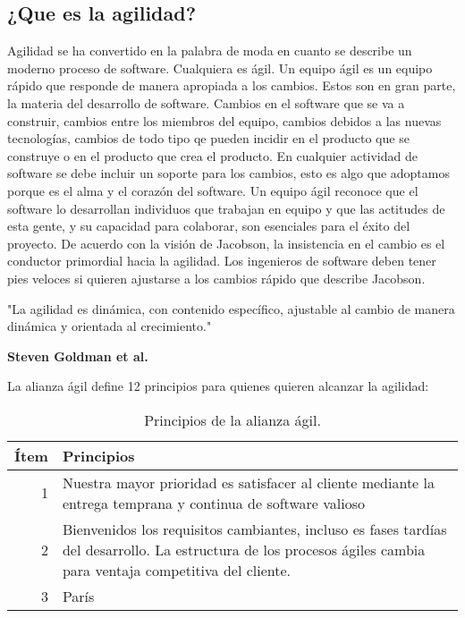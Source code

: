 			\subsection{¿Que es la agilidad?}
			Agilidad se ha convertido en la palabra de moda en cuanto se describe un moderno proceso de software. Cualquiera es ágil. Un equipo ágil es un equipo rápido que responde de manera apropiada a los cambios. Estos son en gran parte, la materia del desarrollo de software. Cambios en el software que se va a construir, cambios entre los miembros del equipo, cambios debidos a las nuevas tecnologías, cambios de todo tipo qe pueden incidir en el producto que se construye o en el producto que crea el producto. En cualquier actividad de software se debe incluir un soporte para los cambios, esto es algo que adoptamos porque es el alma y el corazón del software. Un equipo ágil reconoce que el software lo desarrollan individuos que trabajan en equipo y que las actitudes de esta gente, y su capacidad para colaborar, son esenciales para el éxito del proyecto. De acuerdo con la visión de Jacobson, la insistencia en el cambio es el conductor primordial hacia la agilidad. Los ingenieros de software deben tener pies veloces si quieren ajustarse a los cambios rápido que describe Jacobson.\vspace*{0.3in}
			
			\begin{shaded}
				"La agilidad es dinámica, con contenido específico, ajustable al cambio de manera dinámica y orientada al crecimiento."\\
				\begin{flushright}
					\textbf{Steven Goldman et al.}
				\end{flushright}
			\end{shaded}
			La alianza ágil define 12 principios para quienes quieren alcanzar la agilidad:\\
			
			\begin{table}[htbp]
				\begin{center}
					\begin{tabular}{|r|l|}
						\hline
						Ítem & Principios \\
						\hline \hline
						1 & Nuestra mayor prioridad es satisfacer al cliente mediante la entrega temprana y continua de software valioso \\ \hline
						2 & Bienvenidos los requisitos cambiantes, incluso es fases tardías del desarrollo. La estructura de los procesos ágiles cambia para ventaja competitiva del cliente. \\ \hline
						3 & París \\ \hline
					\end{tabular}
					\caption{Principios de la alianza ágil.}
					\label{tabla:sencilla}
				\end{center}
			\end{table}